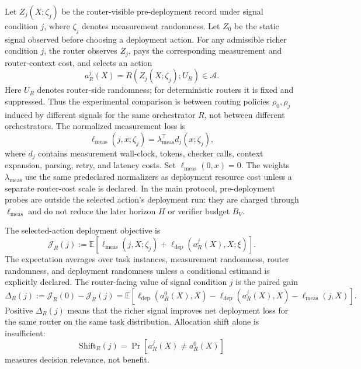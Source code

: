 \documentclass{article}
\newcommand{\cA}{\mathcal{A}}
\newcommand{\E}{\mathbb{E}}
\newcommand{\J}{\mathcal{J}}
\begin{document}
Let $Z_j(X;\zeta_j)$ be the router-visible pre-deployment record under signal condition $j$, where $\zeta_j$ denotes measurement randomness.
Let $Z_0$ be the static signal observed before choosing a deployment action.
For any admissible richer condition $j$, the router observes $Z_j$, pays the corresponding measurement and router-context cost, and selects an action
\[
a_R^j(X)=R(Z_j(X;\zeta_j);U_R)\in\cA .
\]
Here $U_R$ denotes router-side randomness; for deterministic routers it is fixed and suppressed.
Thus the experimental comparison is between routing policies $\rho_0,\rho_j$ induced by different signals for the same orchestrator $R$, not between different orchestrators.
The normalized measurement loss is
\[
\ell_{\mathrm{meas}}(j,x;\zeta_j)
=
\lambda_{\mathrm{meas}}^\top d_j(x;\zeta_j),
\]
where $d_j$ contains measurement wall-clock, tokens, checker calls, context expansion, parsing, retry, and latency costs.
Set $\ell_{\mathrm{meas}}(0,x)=0$.
The weights $\lambda_{\mathrm{meas}}$ use the same predeclared normalizers as deployment resource cost unless a separate router-cost scale is declared.
In the main protocol, pre-deployment probes are outside the selected action's deployment run: they are charged through $\ell_{\mathrm{meas}}$ and do not reduce the later horizon $H$ or verifier budget $B_V$.

The selected-action deployment objective is
\begin{equation}
\J_R(j)
:=
\E\left[
\ell_{\mathrm{meas}}(j,X;\zeta_j)
+\ell_{\mathrm{dep}}(a_R^j(X),X;\xi)
\right].
\label{eq:router-objective}
\end{equation}
The expectation averages over task instances, measurement randomness, router randomness, and deployment randomness unless a conditional estimand is explicitly declared.
The router-facing value of signal condition $j$ is the paired gain
\begin{equation}
\Delta_R(j)
:=
\J_R(0)-\J_R(j)
=
\E\!\left[
\ell_{\mathrm{dep}}(a_R^0(X),X)
-
\ell_{\mathrm{dep}}(a_R^j(X),X)
-
\ell_{\mathrm{meas}}(j,X)
\right].
\label{eq:router-gain}
\end{equation}
Positive $\Delta_R(j)$ means that the richer signal improves net deployment loss for the same router on the same task distribution.
Allocation shift alone is insufficient:
\[
\mathrm{Shift}_R(j)=\Pr[a_R^j(X)\neq a_R^0(X)]
\]
measures decision relevance, not benefit.
\end{document}
